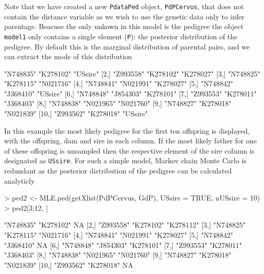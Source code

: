 \documentclass{article}
\begin{document}
Note that we have created a new \texttt{PdataPed} object, \texttt{PdPCervus}, that does not contain the distance variable as we wish to use the genetic data only to infer parentage.  Beacuse the only unkown in this model is the pedigree the object \texttt{model1} only contains a single element (\texttt{P}): the posterior distribution of the pedigree.  By default this is the marginal distribution of parental pairs, and we can extract the mode of this distribution

\begin{Schunk}
\begin{Soutput}
      [,1]      [,2]      [,3]     
 [1,] "N748835" "K278102" "USsire" 
 [2,] "Z993558" "K278102" "K278027"
 [3,] "N748825" "K278115" "N021716"
 [4,] "N748841" "N021991" "K278027"
 [5,] "N748842" "J368410" "USsire" 
 [6,] "N748848" "J854303" "K278101"
 [7,] "Z993553" "K278011" "J368403"
 [8,] "N748838" "N021965" "N021760"
 [9,] "N748827" "K278018" "N021839"
[10,] "Z993562" "K278018" "USsire" 
\end{Soutput}
\end{Schunk}

In this example the most likely pedigree for the first ten offspring is displayed, with the offspring, dam and sire in each column.  If the most likely father for one of these offspring is unsampled then the respective element of the sire column is designated as \texttt{USsire}. For such a simple model, Markov chain Monte Carlo is redundant as the posterior distribution of the pedigree can be calculated analyticly

\begin{Schunk}
\begin{Sinput}
> ped2 <- MLE.ped(getXlist(PdPCervus, GdP), USsire = TRUE, nUSsire = 10)
> ped2[3:12, ]
\end{Sinput}
\begin{Soutput}
      [,1]      [,2]      [,3]     
 [1,] "N748835" "K278102" NA       
 [2,] "Z993558" "K278102" "K278112"
 [3,] "N748825" "K278115" "N021716"
 [4,] "N748841" "N021991" "K278027"
 [5,] "N748842" "J368410" NA       
 [6,] "N748848" "J854303" "K278101"
 [7,] "Z993553" "K278011" "J368403"
 [8,] "N748838" "N021965" "N021760"
 [9,] "N748827" "K278018" "N021839"
[10,] "Z993562" "K278018" NA       
\end{Soutput}
\end{Schunk}
\end{document}
